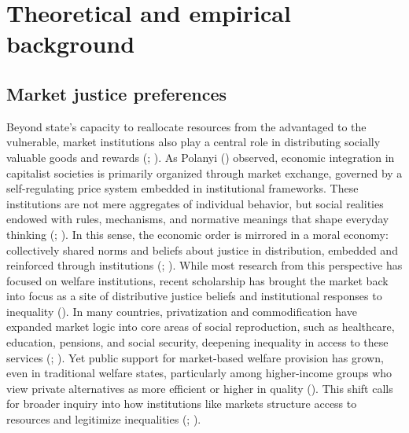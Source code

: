 \documentclass[
  13pt,
]{article}
\begin{document}
\section{Theoretical and empirical
background}\label{theoretical-and-empirical-background}

\subsection{Market justice
preferences}\label{market-justice-preferences}

Beyond state's capacity to reallocate resources from the advantaged to
the vulnerable, market institutions also play a central role in
distributing socially valuable goods and rewards
(;
). As Polanyi
() observed, economic integration
in capitalist societies is primarily organized through market exchange,
governed by a self-regulating price system embedded in institutional
frameworks. These institutions are not mere aggregates of individual
behavior, but social realities endowed with rules, mechanisms, and
normative meanings that shape everyday thinking
(;
). In this sense,
the economic order is mirrored in a moral economy: collectively shared
norms and beliefs about justice in distribution, embedded and reinforced
through institutions (;
). While most
research from this perspective has focused on welfare institutions,
recent scholarship has brought the market back into focus as a site of
distributive justice beliefs and institutional responses to inequality
(). In many
countries, privatization and commodification have expanded market logic
into core areas of social reproduction, such as healthcare, education,
pensions, and social security, deepening inequality in access to these
services (;
). Yet public support
for market-based welfare provision has grown, even in traditional
welfare states, particularly among higher-income groups who view private
alternatives as more efficient or higher in quality
().
This shift calls for broader inquiry into how institutions like markets
structure access to resources and legitimize inequalities
(;
).
\end{document}
